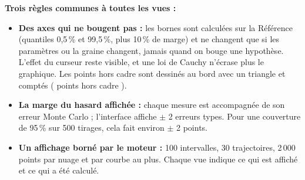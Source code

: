 \documentclass[11pt,a4paper]{article}
\begin{document}
\textbf{Trois règles communes à toutes les vues :}
\begin{itemize}[leftmargin=*, nosep]
  \item \textbf{Des axes qui ne bougent pas :} les bornes sont calculées sur la Référence (quantiles 0,5\,\% et 99,5\,\%, plus 10\,\% de marge) et ne changent que si les paramètres ou la graine changent, jamais quand on bouge une hypothèse. L'effet du curseur reste visible, et une loi de Cauchy n'écrase plus le graphique. Les points hors cadre sont dessinés au bord avec un triangle et comptés ( points hors cadre \fg{}).
  \item \textbf{La marge du hasard affichée :} chaque mesure est accompagnée de son erreur Monte Carlo ; l'interface affiche $\pm$ 2 erreurs types. Pour une couverture de 95\,\% sur 500 tirages, cela fait environ $\pm$ 2 points.
  \item \textbf{Un affichage borné par le moteur :} 100 intervalles, 30 trajectoires, 2\,000 points par nuage et par courbe au plus. Chaque vue indique ce qui est affiché et ce qui a été calculé.
\end{itemize}
\end{document}
